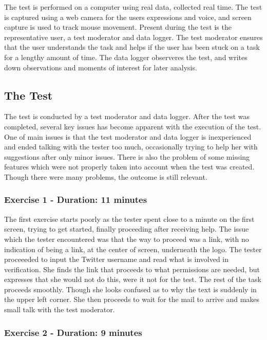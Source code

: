 The test is performed on a computer using real data, collected real time. The
test is captured using a web camera for the users expressions and voice, and
screen capture is used to track mouse movement. Present during the test is the
representative user, a test moderator and data logger. The test moderator
ensures that the user understands the task and helps if the user has been stuck
on a task for a lengthy amount of time. The data logger observeres the test,
and writes down observations and moments of interest for later analysis.

\subsection{The Test}\label{subsec:UXTest}
The test is conducted by a test moderator and data logger. After the test was
completed, several key issues has become apparent with the execution of the
test. One of main issues is that the test moderator and data logger is
inexperienced and ended talking with the tester too much, occasionally trying
to help her with suggestions after only minor issues. There is also the problem
of some missing features which were not properly taken into account when the
test was created. Though there were many problems, the outcome is still
relevant.

\subsubsection{Exercise 1 - Duration: 11 minutes}
The first exercise starts poorly as the tester spent close to a minute on the
first screen, trying to get started, finally proceeding after receiving help.
The issue which the tester encountered was that the way to proceed was a link,
with no indication of being a link, at the center of screen, underneath the
logo. The tester proceeeded to input the Twitter username and read what is
involved in verification. She finds the link that proceeds to what permissions
are needed, but expresses that she would not do this, were it not for the test.
The rest of the task proceeds smoothly. Though she looks confused as to why the
text is suddenly in the upper left corner. She then proceeds to wait for the
mail to arrive and makes small talk with the test moderator.\nl





\subsubsection{Exercise 2 - Duration: 9 minutes}





